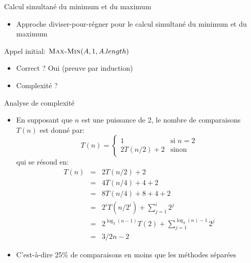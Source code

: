 \begin{frame}{Calcul simultané du minimum et du maximum}

\begin{itemize}
\item Approche diviser-pour-régner pour le calcul simultané du minimum et du maximum
\end{itemize}

\begin{center}
{\small
{}
}
\end{center}

\centerline{Appel initial: $\textnormal{\scshape Max-Min}(A,1,A.length)$}

\bigskip

\begin{itemize}
\item Correct ? Oui (preuve par induction)
\item Complexité ?
\end{itemize}

\end{frame}

\begin{frame}{Analyse de complexité}

\begin{itemize}
\item En supposant que $n$ est une puissance de 2, le nombre de
  comparaisons $T(n)$ est donné par: {\small
\[
T(n) = \left\{
\begin{array}{ll}
 1 & \mbox{si }n=2\\
2 T(n/2)+2 & \mbox{sinon}
\end{array}
\right.
\]}
qui se résoud en:
{\footnotesize
\begin{eqnarray*}
T(n) & = & 2 T(n/2)+2\\
& = & 4 T(n/4)+4+2\\
& = & 8 T(n/4)+8+4+2\\
& = & 2^i T(n/2^i)+\sum_{j=1}^i 2^j\\
& = & 2^{\log_2(n-1)} T(2)+\sum_{j=1}^{\log_2(n)-1} 2^j\\
& = & 3/2 n -2
\end{eqnarray*}}
\item C'est-à-dire 25\% de comparaisons en moins que les méthodes séparées
\end{itemize}

\end{frame}

